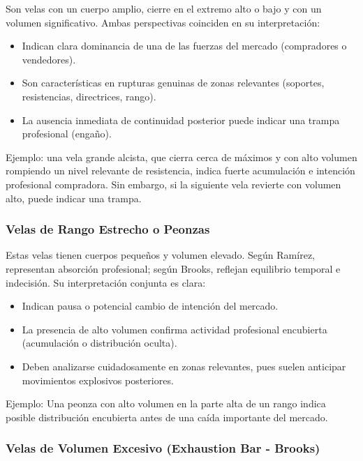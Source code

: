 Son velas con un cuerpo amplio, cierre en el extremo alto o bajo y con un volumen significativo. Ambas perspectivas coinciden en su interpretaci\'on:

\begin{itemize}
    \sloppy
    \item Indican clara dominancia de una de las fuerzas del mercado (compradores o vendedores).
    \item Son caracter\'isticas en rupturas genuinas de zonas relevantes (soportes, resistencias, directrices, rango).
    \item La ausencia inmediata de continuidad posterior puede indicar una trampa profesional (enga\~no).
\end{itemize}

Ejemplo: una vela grande alcista, que cierra cerca de m\'aximos y con alto volumen rompiendo un nivel relevante de resistencia, indica fuerte acumulaci\'on e intenci\'on profesional compradora. Sin embargo, si la siguiente vela revierte con volumen alto, puede indicar una trampa.

\subsubsection{Velas de Rango Estrecho o Peonzas}

Estas velas tienen cuerpos peque\~nos y volumen elevado. Seg\'un Ram\'irez, representan absorci\'on profesional; seg\'un Brooks, reflejan equilibrio temporal e indecisi\'on. Su interpretaci\'on conjunta es clara:

\begin{itemize}
    \item Indican pausa o potencial cambio de intenci\'on del mercado.
    \item La presencia de alto volumen confirma actividad profesional encubierta (acumulaci\'on o distribuci\'on oculta).
    \item Deben analizarse cuidadosamente en zonas relevantes, pues suelen anticipar movimientos explosivos posteriores.
\end{itemize}

Ejemplo: Una peonza con alto volumen en la parte alta de un rango indica posible distribuci\'on encubierta antes de una ca\'ida importante del mercado.

\subsubsection{Velas de Volumen Excesivo (Exhaustion Bar - Brooks)}

